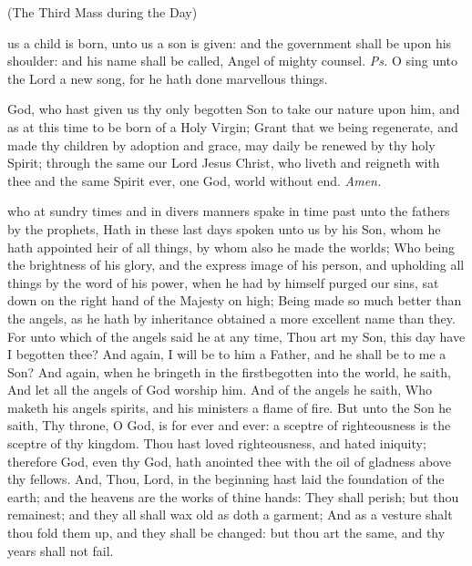 \begin{inhead}
	(The Third Mass during the Day)
\end{inhead}

\vspace{-0.25\baselineskip}

\introit
{} us a child is born, unto us a son is given: and the government shall be upon his shoulder: and his name shall be called, Angel of mighty counsel. \textit{Ps.} O sing unto the Lord a new song, for he hath done marvellous things.

\vspace{-0.25\baselineskip}

\collect\label{NativityMassIIICollect}
 God, who hast given us thy only begotten Son to take our nature upon him, and as at this time to be born of a Holy Virgin; Grant that we being regenerate, and made thy children by adoption and grace, may daily be renewed by thy holy Spirit; through the same our Lord Jesus Christ, who liveth and reigneth with thee and the same Spirit ever, one God, world without end. \textit{Amen.}

\vspace{-0.25\baselineskip}

 who at sundry times and in divers manners spake in time past unto the fathers by the prophets, Hath in these last days spoken unto us by his Son, whom he hath appointed heir of all things, by whom also he made the worlds; Who being the brightness of his glory, and the express image of his person, and upholding all things by the word of his power, when he had by himself purged our sins, sat down on the right hand of the Majesty on high; Being made so much better than the angels, as he hath by inheritance obtained a more excellent name than they. For unto which of the angels said he at any time, Thou art my Son, this day have I begotten thee? And again, I will be to him a Father, and he shall be to me a Son? And again, when he bringeth in the firstbegotten into the world, he saith, And let all the angels of God worship him. And of the angels he saith, Who maketh his angels spirits, and his ministers a flame of fire. But unto the Son he saith, Thy throne, O God, is for ever and ever: a sceptre of righteousness is the sceptre of thy kingdom. Thou hast loved righteousness, and hated iniquity; therefore God, even thy God, hath anointed thee with the oil of gladness above thy fellows. And, Thou, Lord, in the beginning hast laid the foundation of the earth; and the heavens are the works of thine hands: They shall perish; but thou remainest; and they all shall wax old as doth a garment; And as a vesture shalt thou fold them up, and they shall be changed: but thou art the same, and thy years shall not fail.


